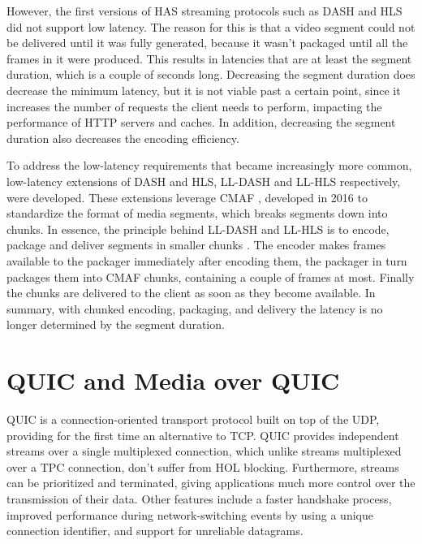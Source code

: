 However, the first versions of \ac{HAS} streaming protocols such as DASH and HLS did not support low latency. The reason for this is that a video segment could not be delivered until it was fully generated, because it wasn't packaged until all the frames in it were produced. This results in latencies that are at least the segment duration, which is a couple of seconds long. Decreasing the segment duration does decrease the minimum latency, but it is not viable past a certain point, since it increases the number of requests the client needs to perform, impacting the performance of HTTP servers and caches. In addition, decreasing the segment duration also decreases the encoding efficiency.

To address the low-latency requirements that became increasingly more common, low-latency extensions of \ac{DASH} and \ac{HLS}, LL-DASH and LL-HLS respectively, were developed. These extensions leverage \ac{CMAF} \parencite{14:00-17:00ISOIEC2300019}, developed in 2016 to standardize the format of media segments, which breaks segments down into chunks. In essence, the principle behind LL-DASH and LL-HLS is to encode, package and deliver segments in smaller chunks \parencite{bentalebOneSecondLatencyEvolution2023, durakEvaluatingPerformanceApple2020}. The encoder makes frames available to the packager immediately after encoding them, the packager in turn packages them into CMAF chunks, containing a couple of frames at most. Finally the chunks are delivered to the client as soon as they become available. In summary, with chunked encoding, packaging, and delivery the latency is no longer determined by the segment duration.

\section{QUIC and Media over QUIC}
QUIC is a connection-oriented transport protocol built on top of the \ac{UDP}, providing for the first time an alternative to TCP. QUIC provides independent streams over a single multiplexed connection, which unlike streams multiplexed over a TPC connection, don't suffer from \ac{HOL} blocking. Furthermore, streams can be prioritized and terminated, giving applications much more control over the transmission of their data. Other features include a faster handshake process, improved performance during network-switching events by using a unique connection identifier, and support for unreliable datagrams.

